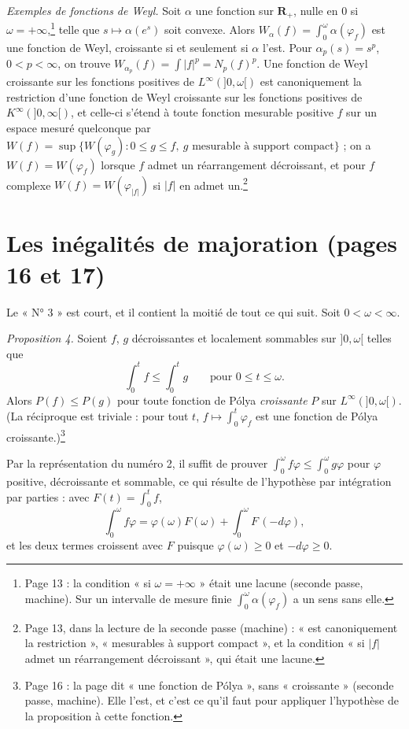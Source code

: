 \documentclass[11pt,a4paper]{article}
\begin{document}
\emph{Exemples de fonctions de Weyl.} Soit $\alpha$ une fonction sur
$\mathbf{R}_{+}$, nulle en $0$ si $\omega = +\infty$,\footnote{Page 13 : la
condition « si $\omega = +\infty$ » était une lacune (seconde passe,
machine). Sur un intervalle de mesure finie $\int_0^\omega \alpha(\varphi_f)$
a un sens sans elle.} telle que $s \mapsto \alpha(e^s)$ soit
convexe. Alors $W_\alpha(f) = \int_0^\omega \alpha(\varphi_f)$ est une
fonction de Weyl, croissante si et seulement si $\alpha$ l'est. Pour
$\alpha_p(s) = s^p$, $0 < p < \infty$, on trouve $W_{\alpha_p}(f) = \int
|f|^p = N_p(f)^p$. Une fonction de Weyl croissante sur les fonctions
positives de $L^\infty(]0,\omega[)$ est canoniquement la restriction d'une
fonction de Weyl croissante sur les fonctions positives de
$K^\infty(]0,\infty[)$, et celle-ci s'étend à toute fonction mesurable
positive $f$ sur un espace mesuré quelconque par $W(f) = \sup\{W(\varphi_g) :
0 \leq g \leq f,\ g \text{ mesurable à support compact}\}$ ; on a $W(f) =
W(\varphi_f)$ lorsque $f$ admet un réarrangement décroissant, et pour $f$
complexe $W(f) = W(\varphi_{|f|})$ si $|f|$ en admet un.\footnote{Page 13,
dans la lecture de la seconde passe (machine) : « est canoniquement la
restriction », « mesurables à support compact », et la condition « si $|f|$
admet un réarrangement décroissant », qui était une lacune.}

\section*{Les inégalités de majoration (pages 16 et 17)}

Le « N° 3 » est court, et il contient la moitié de tout ce qui suit. Soit
$0 < \omega < \infty$.

\emph{Proposition 4.} Soient $f$, $g$ décroissantes et localement sommables
sur $]0,\omega[$ telles que
\[
  \int_0^t f \leq \int_0^t g \qquad \text{pour } 0 \leq t \leq \omega .
\]
Alors $P(f) \leq P(g)$ pour toute fonction de Pólya \emph{croissante} $P$ sur
$L^\infty(]0,\omega[)$. (La réciproque est triviale : pour tout $t$,
$f \mapsto \int_0^t \varphi_f$ est une fonction de Pólya croissante.)\footnote{Page
16 : la page dit « une fonction de Pólya », sans « croissante » (seconde
passe, machine). Elle l'est, et c'est ce qu'il faut pour appliquer
l'hypothèse de la proposition à cette fonction.}

Par la représentation du numéro 2, il suffit de prouver $\int_0^\omega f\varphi
\leq \int_0^\omega g\varphi$ pour $\varphi$ positive, décroissante et sommable,
ce qui résulte de l'hypothèse par intégration par parties : avec
$F(t) = \int_0^t f$,
\[
  \int_0^\omega f\varphi = \varphi(\omega)F(\omega) + \int_0^\omega F\,(-d\varphi),
\]
et les deux termes croissent avec $F$ puisque $\varphi(\omega) \geq 0$ et
$-d\varphi \geq 0$.
\end{document}
